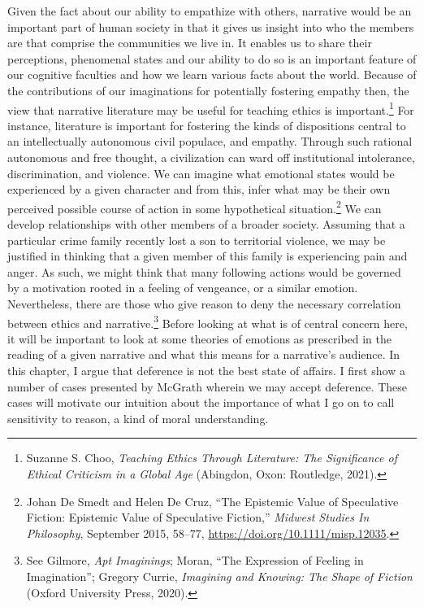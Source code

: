 \documentclass[phdthesis,12pt,final]{wuthesis}
\theoremstyle{definition}
\theoremstyle{definition}
\theoremstyle{definition}
\theoremstyle{definition}
\theoremstyle{remark}
\begin{document}
Given the fact about our ability to empathize with others, narrative would be an important part of human society in that it gives us insight into who the members are that comprise the communities we live in. It enables us to share their perceptions, phenomenal states and our ability to do so is an important feature of our cognitive faculties and how we learn various facts about the world. Because of the contributions of our imaginations for potentially fostering empathy then, the view that narrative literature may be useful for teaching ethics is important.\footnote{Suzanne S. Choo, \emph{Teaching Ethics Through Literature: The Significance of Ethical Criticism in a Global Age} (Abingdon, Oxon: Routledge, 2021).} For instance, literature is important for fostering the kinds of dispositions central to an intellectually autonomous civil populace, and empathy. Through such rational autonomous and free thought, a civilization can ward off institutional intolerance, discrimination, and violence. We can imagine what emotional states would be experienced by a given character and from this, infer what may be their own perceived possible course of action in some hypothetical situation.\footnote{Johan De Smedt and Helen De Cruz, {``The Epistemic Value of Speculative Fiction: Epistemic Value of Speculative Fiction,''} \emph{Midwest Studies In Philosophy}, September 2015, 58--77, \url{https://doi.org/10.1111/misp.12035}.} We can develop relationships with other members of a broader society. Assuming that a particular crime family recently lost a son to territorial violence, we may be justified in thinking that a given member of this family is experiencing pain and anger. As such, we might think that many following actions would be governed by a motivation rooted in a feeling of vengeance, or a similar emotion. Nevertheless, there are those who give reason to deny the necessary correlation between ethics and narrative.\footnote{See Gilmore, \emph{Apt {Imaginings}}; Moran, {``The {Expression} of {Feeling} in {Imagination}''}; Gregory Currie, \emph{Imagining and Knowing: The Shape of Fiction} (Oxford University Press, 2020).} Before looking at what is of central concern here, it will be important to look at some theories of emotions as prescribed in the reading of a given narrative and what this means for a narrative's audience. In this chapter, I argue that deference is not the best state of affairs. I first show a number of cases presented by McGrath wherein we may accept deference. These cases will motivate our intuition about the importance of what I go on to call sensitivity to reason, a kind of moral understanding.
\end{document}
